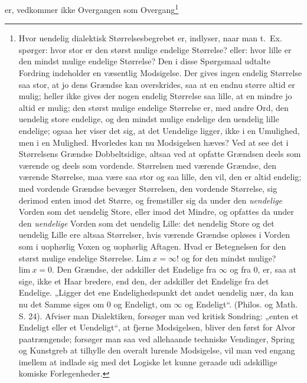 \documentclass[12pt,a4paper]{book}
\begin{document}
er, vedkommer ikke Overgangen som Overgang\footnote{Hvor uendelig
dialektisk Størrelsesbegrebet er, indlyser, naar man t.~Ex. spørger:
hvor stor er den størst mulige endelige Størrelse? eller: hvor lille er
den mindst mulige endelige Størrelse? Den i disse Spørgsmaal udtalte
Fordring indeholder en væsentlig Modsigelse. Der gives ingen endelig
Størrelse saa stor, at jo dens Grændse kan overskrides, saa at en endnu
større altid er mulig; heller ikke gives der nogen endelig Størrelse
saa lille, at en mindre jo altid er mulig; den størst mulige endelige
Størrelse er, med andre Ord, den uendelig store endelige, og den mindst
mulige endelige den uendelig lille endelige; ogsaa her viser det sig,
at det Uendelige ligger, ikke i en Umulighed, men i en Mulighed.
Hvorledes kan nu Modsigelsen hæves? Ved at see det i Størrelsens
Grændse Dobbeltsidige, altsaa ved at opfatte Grændsen deels som
værende og deels som vordende. Størrelsen med værende Grændse, den
værende Størrelse, maa være saa stor og saa lille, den vil, den er
altid endelig; med vordende Grændse bevæger Størrelsen, den vordende
Størrelse, sig derimod enten imod det Større, og fremstiller sig da
under den \emph{uendelige} Vorden som det uendelig Store, eller imod
det Mindre, og opfattes da under den \emph{uendelige} Vorden som det
uendelig Lille: det nendelig Store og det uendelig Lille ere altsaa
Størrelser, hvis værende Grændse opløses i Vorden som i uophørlig Voxen
og uophørlig Aftagen. Hvad er Betegnelsen for den størst mulige
endelige Størrelse. $\mathrm{Lim}\ x = \infty$! og for den mindst
mulige? $\mathrm{lim}\ x = 0$. Den Grændse, der adskiller det Endelige
fra $\infty$ og fra $0$, er, saa at sige, ikke et Haar bredere, end
den, der adskiller det Endelige fra det Endelige. „Ligger det ene
Endelighedspunkt det andet uendelig nær, da kan nu det Samme siges om
$0$ og Endeligt, om $\infty$ og Endeligt“. (Philos. og Math. S. 24).
Afviser man Dialektiken, forsøger man ved kritisk Sondring: „enten et
Endeligt eller et Uendeligt“, at fjerne Modsigelsen, bliver den først
for Alvor paatrængende; forsøger man saa ved allehaande techniske
Vendinger, Spring og Kunstgreb at tilhylle den overalt lurende
Modsigelse, vil man ved engang imellem at indlade sig med det Logiske
let kunne geraade udi adskillige komiske Forlegenheder.
}
\end{document}
